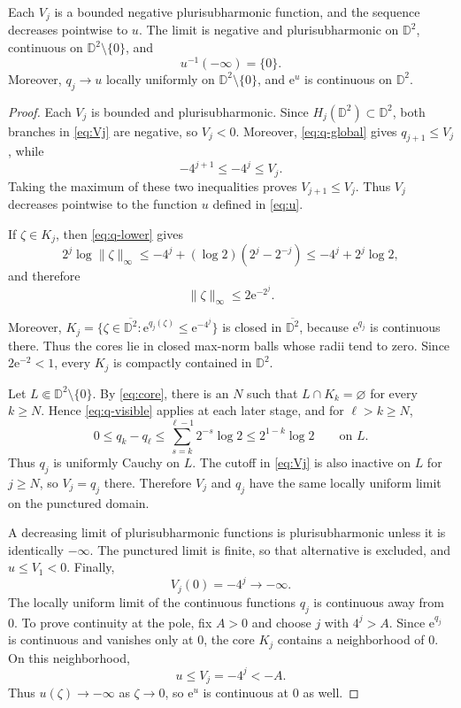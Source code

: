 \documentclass[11pt,a4paper]{article}
\newcommand{\e}{\mathrm e}
\begin{document}
\begin{proposition}\label{prop:limit}
Each $V_j$ is a bounded negative plurisubharmonic function, and the sequence decreases pointwise to $u$.
The limit is negative and plurisubharmonic on $\mathbb D^2$, continuous on $\mathbb D^2\setminus\{0\}$, and
\[
  u^{-1}(-\infty)=\{0\}.
\]
Moreover, $q_j\to u$ locally uniformly on $\mathbb D^2\setminus\{0\}$, and $\e^u$ is continuous on $\mathbb D^2$.
\end{proposition}

\begin{proof}
Each $V_j$ is bounded and plurisubharmonic. Since $H_j(\mathbb D^2)\subset\mathbb D^2$, both branches in \eqref{eq:Vj} are negative, so $V_j<0$. Moreover, \eqref{eq:q-global} gives $q_{j+1}\le V_j$, while
\[
  -4^{j+1}\le-4^j\le V_j.
\]
Taking the maximum of these two inequalities proves $V_{j+1}\le V_j$. Thus $V_j$ decreases pointwise to the function $u$ defined in \eqref{eq:u}.

If $\zeta\in K_j$, then \eqref{eq:q-lower} gives
\[
  2^j\log\|\zeta\|_\infty \le-4^j+(\log 2)\left(2^j-2^{-j}\right) \le-4^j+2^j\log 2,
\]
and therefore
\begin{equation}\label{eq:core}
  \|\zeta\|_\infty
  \le 2\e^{-2^j}.
\end{equation}

Moreover, $K_j=\{\zeta\in\overline{\mathbb D^2}:\e^{q_j(\zeta)}\le\e^{-4^j}\}$ is closed in $\overline{\mathbb D^2}$,
because $\e^{q_j}$ is continuous there. Thus the cores lie in closed max-norm balls whose radii tend to zero. Since $2\e^{-2}<1$, every $K_j$ is compactly contained in $\mathbb D^2$.

Let $L\Subset \mathbb D^2\setminus\{0\}$. By \eqref{eq:core}, there is an $N$ such that $L\cap K_k=\varnothing$ for every $k\ge N$. Hence \eqref{eq:q-visible} applies at each later stage, and for $\ell>k\ge N$,
\[
  0\le q_k-q_\ell
  \le\sum_{s=k}^{\ell-1}2^{-s}\log 2
  \le2^{1-k}\log 2
  \qquad\text{on }L.
\]
Thus $q_j$ is uniformly Cauchy on $L$. The cutoff in \eqref{eq:Vj} is also inactive on $L$ for $j\ge N$, so $V_j=q_j$ there. Therefore $V_j$ and $q_j$ have the same locally uniform limit on the punctured domain.

A decreasing limit of plurisubharmonic functions is plurisubharmonic unless it is identically $-\infty$. The punctured limit is finite, so that alternative is excluded, and $u\le V_1<0$. Finally,
\[
  V_j(0)=-4^j\longrightarrow-\infty.
\]
The locally uniform limit of the continuous functions $q_j$ is continuous away from $0$. To prove continuity at the pole, fix $A>0$ and choose $j$ with $4^j>A$. Since $\e^{q_j}$ is continuous and vanishes only at $0$, the core $K_j$ contains a neighborhood of $0$. On this neighborhood,
\[
  u\le V_j=-4^j<-A.
\]
Thus $u(\zeta)\to-\infty$ as $\zeta\to0$, so $\e^u$ is continuous at $0$ as well.
\end{proof}
\end{document}
